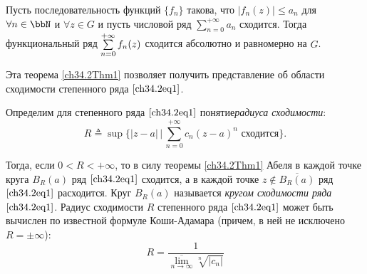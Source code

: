 \begin{stt}
Пусть последовательность функций $\{f_n\}$ такова, что $|f_n(z)| \le a_n$ для $\forall n \in \bbN$ и $\forall z \in G$ и пусть числовой ряд $\sum\limits_{n = 0}^{+\infty} a_n$ сходится. Тогда функциональный ряд $\sum_{n = 0}^{+\infty}\limits f_n(z)$ сходится абсолютно и равномерно на $G$. 
\end{stt}

Эта теорема \ref{ch34.2Thm1} позволяет получить представление об области сходимости степенного ряда $\eqref{ch34.2eq1}$.

Определим для степенного ряда $\eqref{ch34.2eq1}$ понятие\textit{радиуса сходимости}:
\begin{equation} \label{ch34.2eq2}
R \triangleq \sup \{ |z - a| \,\big|\, \sum_{n = 0}^{+\infty} c_n (z - a)^n \text{ сходится} \}.
\end{equation}

Тогда, если $0 < R < +\infty$, то в силу теоремы \ref{ch34.2Thm1} Абеля в каждой точке круга $B_R(a)$ ряд $\eqref{ch34.2eq1}$ сходится, а в каждой точке $z \notin \overline{B_R(a)}$ ряд $\eqref{ch34.2eq1}$ расходится. Круг $B_R(a)$ называется \textit{кругом сходимости ряда} $\eqref{ch34.2eq1}$.
Радиус сходимости $R$ степенного ряда $\eqref{ch34.2eq1}$ может быть вычислен по известной формуле Коши-Адамара (причем, в ней не исключено $R=\pm\infty$):
\begin{equation} \label{ch34.2eq3}
R = \frac{1}{\overline{\lim\limits_{n \to \infty}} \sqrt[n]{|c_n|}}
\end{equation}

